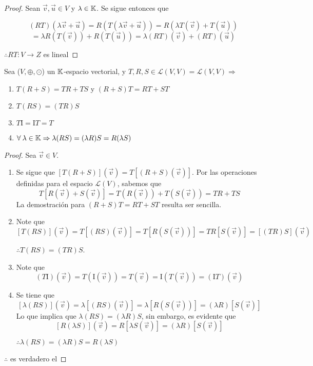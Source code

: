 \begin{proof}
    Sean $\vec{v},\vec{u} \in V$ y $\lambda \in \mathbb{K}$. Se sigue entonces que 
    
    $$(RT)(\lambda \vec{v}+\vec{u}) = R(T(\lambda \vec{v}+\vec{u})) = R(\lambda T(\vec{v})+T(\vec{u}))$$
    $$= \lambda R(T(\vec{v}))+R(T(\vec{u})) = \lambda(RT)(\vec{v})+(RT)(\vec{u})$$

    $\therefore RT : V \to Z$ es lineal
\end{proof}

\begin{theorem}
\label{teo211}
    Sea ($V, \oplus, \odot$) un $\mathbb{K}$-espacio vectorial, y $T,R,S \in \mathscr{L}(V,V) =  \mathscr{L}(V,V) \Rightarrow$ 
    
    \begin{enumerate}
        \item $T(R+S)=TR+TS $ y $ (R+S)T=RT+ST$
        \item $T(RS)=(TR)S$
        \item $T\mathrm{I}=\mathrm{I}T=T$
        \item $\forall \: \lambda \in \mathbb{K} \Rightarrow \lambda(RS)=(\lambda R)S=R(\lambda S)$
    \end{enumerate}
\end{theorem}

\begin{proof}
    Sea $\vec{v} \in V$. 
    
    \begin{enumerate}
        \item Se sigue que $[T(R+S)](\vec{v})=T[(R+S)(\vec{v})]$. Por las operaciones definidas para el espacio $\mathscr{L}(V)$, sabemos que $$T[R(\vec{v})+S(\vec{v})]=T(R(\vec{v}))+T(S(\vec{v}))=TR+TS$$ La demostración para $(R+S)T=RT+ST$ resulta ser sencilla.
        \item Note que $$[T(RS)](\vec{v})=T[(RS)(\vec{v})]=T[R(S(\vec{v}))]=TR[S(\vec{v})]=[(TR)S](\vec{v})$$ 
        
        $\therefore T(RS)=(TR)S$.

        \item Note que $$(T\mathrm{I})(\vec{v})=T(\mathrm{I}(\vec{v}))=T(\vec{v})=\mathrm{I}(T(\vec{v}))=(\mathrm{I}T)(\vec{v})$$ 

        \item Se tiene que $$[\lambda(RS)](\vec{v})=\lambda[(RS)(\vec{v})]=\lambda[R(S(\vec{v}))]=(\lambda R)[S(\vec{v})]$$ Lo que implica que $\lambda(RS)=(\lambda R)S$, sin embargo, es evidente que $$[R(\lambda S)](\vec{v})=R[\lambda S(\vec{v})]=(\lambda R)[S(\vec{v})]$$ 
        
        $\therefore \lambda(RS)=(\lambda R)S=R(\lambda S)$
    \end{enumerate}
    $\therefore$ es verdadero el 
\end{proof}


